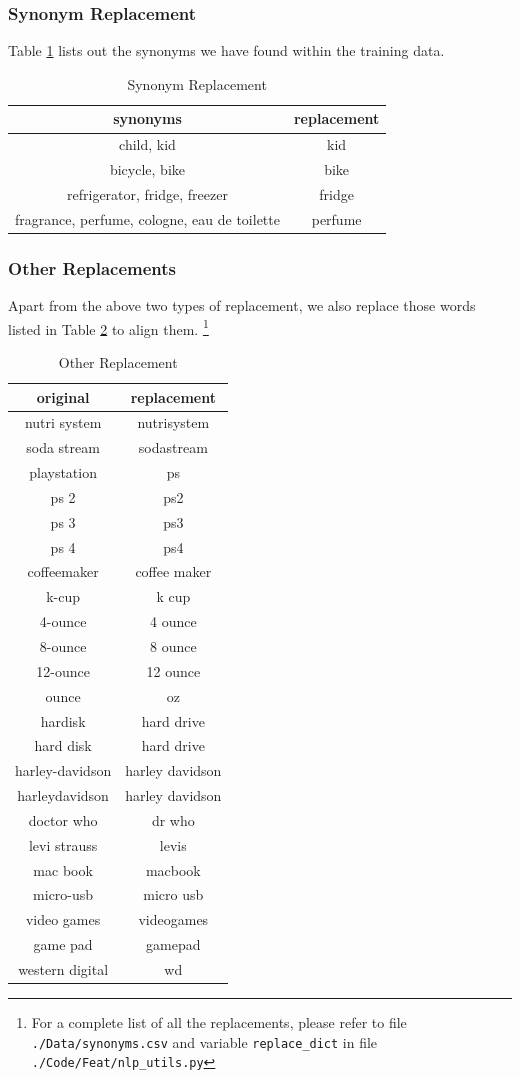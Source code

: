 \documentclass[12pt]{article}
\begin{document}
\subsubsection{Synonym Replacement}
Table \ref{tab:synonym} lists out the synonyms we have found within the training data.
\begin{table}[!htb]
\centering
\caption{Synonym Replacement}
\label{tab:synonym}
\begin{tabular}{|c|c|}
\hline
synonyms & replacement\\
\hline\hline
child, kid & kid\\
bicycle, bike & bike\\
refrigerator, fridge, freezer & fridge\\
fragrance, perfume, cologne, eau de toilette & perfume\\
\hline
\end{tabular}
\end{table}


\subsubsection{Other Replacements}
Apart from the above two types of replacement, we also replace those words listed in Table \ref{tab:Other} to align them. \footnote{For a complete list of all the replacements, please refer to file \texttt{./Data/synonyms.csv} and variable \texttt{replace\_dict} in file \texttt{./Code/Feat/nlp\_utils.py}}
\begin{table}[!htb]
\centering
\caption{Other Replacement}
\label{tab:Other}
\begin{tabular}{|c|c|}
\hline
original & replacement\\
\hline\hline
nutri system & nutrisystem\\
soda stream & sodastream\\
playstation & ps\\
ps 2 & ps2\\
ps 3 & ps3\\
ps 4 & ps4\\
coffeemaker & coffee maker\\
k-cup & k cup\\
4-ounce & 4 ounce\\
8-ounce & 8 ounce\\
12-ounce & 12 ounce\\
ounce & oz\\
hardisk & hard drive\\
hard disk & hard drive\\
harley-davidson & harley davidson\\
harleydavidson & harley davidson\\
doctor who & dr who\\
levi strauss & levis\\
mac book & macbook\\
micro-usb & micro usb\\
video games & videogames\\
game pad & gamepad\\
western digital & wd\\
\hline
\end{tabular}
\end{table}
\end{document}
